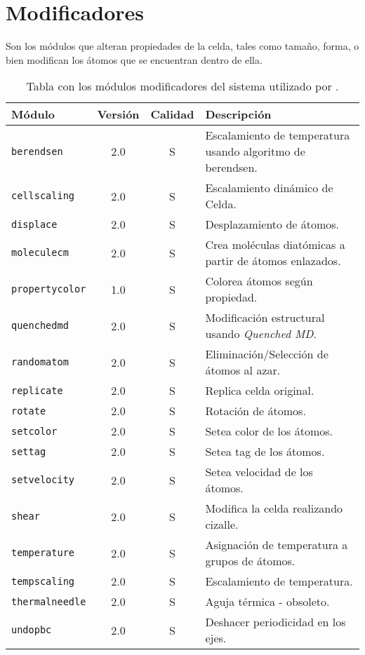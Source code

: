 \section{Modificadores}
Son los m\'odulos que alteran propiedades de la celda, tales como tama\~no, forma, o bien modifican los \'atomos que se encuentran dentro de ella.

\begin{table}[h!]\centering
 \begin{tabular}{|l|c|c|p{10cm}|}\hline
 M\'odulo & Versi\'on & Calidad & Descripci\'on \\
 \hline\hline
 \texttt{berendsen} & 2.0 & S & Escalamiento de temperatura usando algoritmo de berendsen.\\
 \hline
 \texttt{cellscaling} & 2.0 & S & Escalamiento din\'amico de Celda.\\
 \hline
 \texttt{displace} & 2.0 & S & Desplazamiento de \'atomos.\\
 \hline
 \texttt{moleculecm} & 2.0 & S & Crea mol\'eculas diat\'omicas a partir de \'atomos enlazados.\\
 \hline
 \texttt{propertycolor} & 1.0 & S & Colorea \'atomos seg\'un propiedad.\\
 \hline
 \texttt{quenchedmd} & 2.0 & S & Modificaci\'on estructural usando \textit{Quenched MD}.\\
 \hline
 \texttt{randomatom} & 2.0 & S & Eliminaci\'on/Selecci\'on de \'atomos al azar.\\
 \hline
 \texttt{replicate} & 2.0 & S & Replica celda original.\\
 \hline
 \texttt{rotate} & 2.0 & S & Rotaci\'on de \'atomos.\\
 \hline
 \texttt{setcolor} & 2.0 & S & Setea color de los \'atomos.\\
 \hline
 \texttt{settag} & 2.0 & S & Setea tag de los \'atomos.\\
 \hline
 \texttt{setvelocity} & 2.0 & S & Setea velocidad de los \'atomos.\\
 \hline
 \texttt{shear} & 2.0 & S & Modifica la celda realizando cizalle.\\
 \hline
 \texttt{temperature} & 2.0 & S & Asignaci\'on de temperatura a grupos de \'atomos.\\
 \hline
 \texttt{tempscaling} & 2.0 & S & Escalamiento de temperatura.\\
 \hline
 \texttt{thermalneedle} & 2.0 & S & Aguja t\'ermica - obsoleto.\\
 \hline
 \texttt{undopbc} & 2.0 & S & Deshacer periodicidad en los ejes.\\
 \hline
 \end{tabular}
\label{tab:modmodify}
\caption{Tabla con los m\'odulos modificadores del sistema utilizado por {\lpmd}.}
\end{table}

